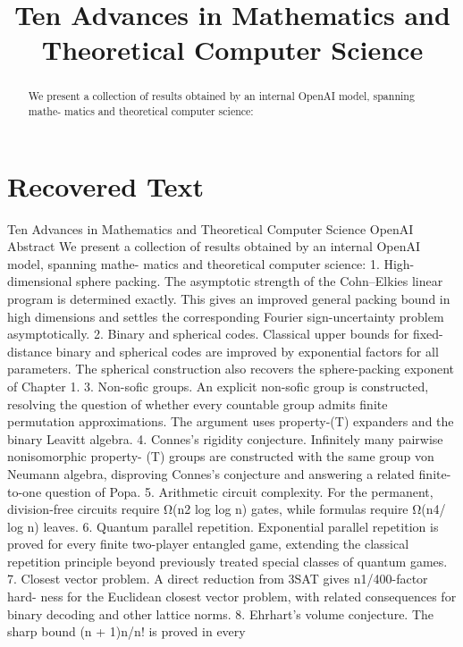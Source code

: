 \title{Ten Advances in Mathematics and Theoretical Computer Science}

\maketitle

\begin{abstract}
We present a collection of results obtained by an internal OpenAI model, spanning mathe- matics and theoretical computer science:
\end{abstract}

\section{Recovered Text}
Ten Advances in Mathematics
and Theoretical Computer Science
OpenAI
Abstract
We present a collection of results obtained by an internal OpenAI model, spanning mathe-
matics and theoretical computer science:
1.
High-dimensional sphere packing. The asymptotic strength of the Cohn–Elkies
linear program is determined exactly. This gives an improved general packing bound
in high dimensions and settles the corresponding Fourier sign-uncertainty problem
asymptotically.
2.
Binary and spherical codes. Classical upper bounds for ﬁxed-distance binary and
spherical codes are improved by exponential factors for all parameters. The spherical
construction also recovers the sphere-packing exponent of Chapter 1.
3.
Non-soﬁc groups. An explicit non-soﬁc group is constructed, resolving the question
of whether every countable group admits ﬁnite permutation approximations. The
argument uses property-(T) expanders and the binary Leavitt algebra.
4.
Connes’s rigidity conjecture. Inﬁnitely many pairwise nonisomorphic property-
(T) groups are constructed with the same group von Neumann algebra, disproving
Connes’s conjecture and answering a related ﬁnite-to-one question of Popa.
5.
Arithmetic circuit complexity. For the permanent, division-free circuits require
Ω(n2 log log n) gates, while formulas require Ω(n4/ log n) leaves.
6.
Quantum parallel repetition. Exponential parallel repetition is proved for every
ﬁnite two-player entangled game, extending the classical repetition principle beyond
previously treated special classes of quantum games.
7.
Closest vector problem. A direct reduction from 3SAT gives n1/400-factor hard-
ness for the Euclidean closest vector problem, with related consequences for binary
decoding and other lattice norms.
8.
Ehrhart’s volume conjecture. The sharp bound (n + 1)n/n! is proved in every
